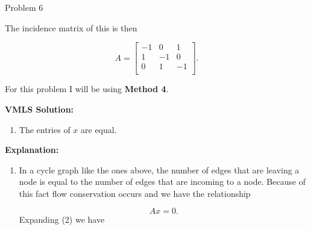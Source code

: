\begin{problem}{Problem 6}
\begin{Highlight}
\begin{enumerate}[label = (\alph*)]
\begin{center}
            \end{center}

            The incidence matrix of this is then

            \setcounter{equation}{0}
            \begin{equation}
                A = 
                \begin{bmatrix}
                    -1 & 0 & 1 \\
                    1 & -1 & 0 \\
                    0 & 1 & -1 \\
                \end{bmatrix}.
            \end{equation}
        \end{enumerate}
    \end{Highlight}

    \begin{Highlight}
        For this problem I will be using \textbf{Method 4}. \vspace*{1em}

        \noindent \textbf{VMLS Solution:} 

        \begin{enumerate}[label = (\alph*), start = 2]
            \item The entries of $x$ are equal.
        \end{enumerate}

        \noindent \textbf{Explanation:}

        \begin{enumerate}[label = (\alph*), start = 2]
            \item In a cycle graph like the ones above, the number of edges that are leaving a node is equal to the number of edges that are incoming to a node. Because of this fact flow conservation
            occurs and we have the relationship

            \begin{equation}
                Ax = 0.
            \end{equation}
            Expanding (2) we have


\end{enumerate}
\end{Highlight}
\end{problem}
